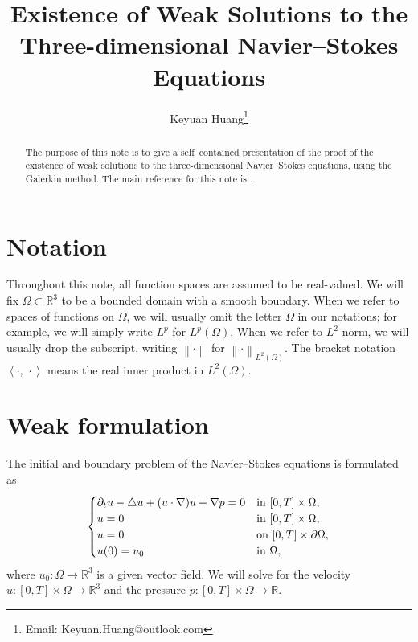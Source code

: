 \documentclass[a4paper, 12pt, oneside]{amsart}
\theoremstyle{definition}
\theoremstyle{remark}
\let\div\relax\DeclareMathOperator{\div}{div}
\newcommand{\norm}[1]{\left\lVert #1 \right\rVert}
\newcommand{\bk}[2]{\left\langle #1,\, #2 \right\rangle}
\newcommand{\p}{\partial}
\newcommand{\laplace}{\triangle}
\newcommand{\R}{\mathbb{R}}
\begin{document}
\title{Existence of Weak Solutions to the Three-dimensional Navier--Stokes Equations}
\author{Keyuan Huang\footnote{Email: Keyuan.Huang@outlook.com}}
\begin{abstract}
The purpose of this note is to give a self--contained presentation of the proof of the existence of weak solutions to the three-dimensional Navier--Stokes equations, using the Galerkin method. The main reference for this note is \cite{robinson2016three}.
\end{abstract}
\maketitle

\section*{Notation}

Throughout this note, all function spaces are assumed to be real-valued. We will fix $\Omega\subset\R^3$ to be a bounded domain with a smooth boundary. 
When we refer to spaces of functions on $\Omega$, we will usually omit the letter $\Omega$ in our notations; for example, we will simply write $L^p$ for $L^p(\Omega)$. 
When we refer to $L^2$ norm, we will usually drop the subscript, writing $\norm{\cdot}$ for $\norm{\cdot}_{L^2(\Omega)}$. 
The bracket notation $\bk{\cdot}{\cdot}$ means the real inner product in $L^2(\Omega)$.

\section{Weak formulation}

The initial and boundary problem of the Navier--Stokes equations is formulated as
\begin{equation}
    \label{eq: NS}
    \begin{cases}
        \p_t u - \laplace u + (u\cdot\nabla)u + \nabla p = 0&\text{in $[0, T]\times\Omega$},\\
        \div u = 0&\text{in $[0, T]\times\Omega$},\\
        u = 0&\text{on $[0, T]\times\p\Omega$},\\
        u(0) = u_0&\text{in $\Omega$},
    \end{cases}
\end{equation}
where $u_0:\Omega\to\R^3$ is a given vector field. We will solve for the velocity $u:[0, T]\times\Omega\to\R^3$ and the pressure $p:[0, T]\times\Omega\to\R$.
\end{document}
